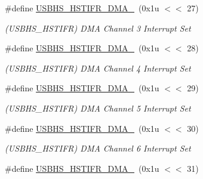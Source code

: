 \begin{DoxyCompactItemize}
\mbox{\label{group__SAMV71__USBHS_ga579f95492fa987c10290c53146a8b647}} 
\#define \mbox{\hyperlink{group__SAMV71__USBHS_ga579f95492fa987c10290c53146a8b647}{U\+S\+B\+H\+S\+\_\+\+H\+S\+T\+I\+F\+R\+\_\+\+D\+M\+A\+\_}}~(0x1u $<$$<$ 27)
\begin{DoxyCompactList}\small\item\em (U\+S\+B\+H\+S\+\_\+\+H\+S\+T\+I\+FR) D\+MA Channel 3 Interrupt Set \end{DoxyCompactList}\item 
\mbox{\label{group__SAMV71__USBHS_ga3668c66c2f3ddc898a55ad26cbaed287}} 
\#define \mbox{\hyperlink{group__SAMV71__USBHS_ga3668c66c2f3ddc898a55ad26cbaed287}{U\+S\+B\+H\+S\+\_\+\+H\+S\+T\+I\+F\+R\+\_\+\+D\+M\+A\+\_}}~(0x1u $<$$<$ 28)
\begin{DoxyCompactList}\small\item\em (U\+S\+B\+H\+S\+\_\+\+H\+S\+T\+I\+FR) D\+MA Channel 4 Interrupt Set \end{DoxyCompactList}\item 
\mbox{\label{group__SAMV71__USBHS_ga4a2554e3461869d5b36cb65dd4251719}} 
\#define \mbox{\hyperlink{group__SAMV71__USBHS_ga4a2554e3461869d5b36cb65dd4251719}{U\+S\+B\+H\+S\+\_\+\+H\+S\+T\+I\+F\+R\+\_\+\+D\+M\+A\+\_}}~(0x1u $<$$<$ 29)
\begin{DoxyCompactList}\small\item\em (U\+S\+B\+H\+S\+\_\+\+H\+S\+T\+I\+FR) D\+MA Channel 5 Interrupt Set \end{DoxyCompactList}\item 
\mbox{\label{group__SAMV71__USBHS_ga7e76b91c622cfc7c3a83a838ebd79dd4}} 
\#define \mbox{\hyperlink{group__SAMV71__USBHS_ga7e76b91c622cfc7c3a83a838ebd79dd4}{U\+S\+B\+H\+S\+\_\+\+H\+S\+T\+I\+F\+R\+\_\+\+D\+M\+A\+\_}}~(0x1u $<$$<$ 30)
\begin{DoxyCompactList}\small\item\em (U\+S\+B\+H\+S\+\_\+\+H\+S\+T\+I\+FR) D\+MA Channel 6 Interrupt Set \end{DoxyCompactList}\item 
\mbox{\label{group__SAMV71__USBHS_ga357833ba3c2fb4ededbecd8e876b1380}} 
\#define \mbox{\hyperlink{group__SAMV71__USBHS_ga357833ba3c2fb4ededbecd8e876b1380}{U\+S\+B\+H\+S\+\_\+\+H\+S\+T\+I\+F\+R\+\_\+\+D\+M\+A\+\_}}~(0x1u $<$$<$ 31)
$$
\end{DoxyCompactItemize}
